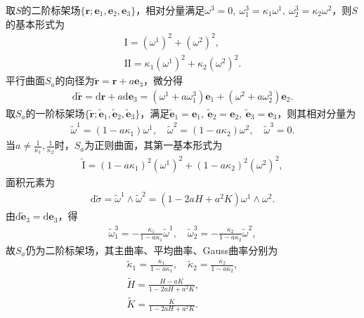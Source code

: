 \documentclass[../../main.tex]{subfiles}%
\begin{document}
\begin{solution}
取$S$的二阶标架场$\{\boldsymbol{r};\boldsymbol{e}_1,\boldsymbol{e}_2,\boldsymbol{e}_3\}$，相对分量满足$\omega^3=0,\ \omega_1^3=\kappa_1\omega^1,\ \omega_2^3=\kappa_2\omega^2$，则$S$的基本形式为
\begin{align}
\mathrm{I}=(\omega^1)^2+(\omega^2)^2,\label{eq:paral-I}\\
\mathrm{II}=\kappa_1(\omega^1)^2+\kappa_2(\omega^2)^2.\label{eq:paral-II}
\end{align}
平行曲面$S_a$的向径为$\tilde{\boldsymbol{r}}=\boldsymbol{r}+a\boldsymbol{e}_3$，微分得
\begin{align*}
\mathrm{d}\tilde{\boldsymbol{r}}=\mathrm{d}\boldsymbol{r}+a\mathrm{d}\boldsymbol{e}_3=(\omega^1+a\omega_1^3)\boldsymbol{e}_1+(\omega^2+a\omega_2^3)\boldsymbol{e}_2.
\end{align*}
取$S_a$的一阶标架场$\{\tilde{\boldsymbol{r}};\tilde{\boldsymbol{e}}_1,\tilde{\boldsymbol{e}}_2,\tilde{\boldsymbol{e}}_3\}$，满足$\tilde{\boldsymbol{e}}_1=\boldsymbol{e}_1,\ \tilde{\boldsymbol{e}}_2=\boldsymbol{e}_2,\ \tilde{\boldsymbol{e}}_3=\boldsymbol{e}_3$，则其相对分量为
\begin{align}
\tilde{\omega}^1=(1-a\kappa_1)\omega^1,\quad \tilde{\omega}^2=(1-a\kappa_2)\omega^2,\quad \tilde{\omega}^3=0.\label{eq:paral-omega}
\end{align}
当$a\neq\frac{1}{\kappa_1},\frac{1}{\kappa_2}$时，$S_a$为正则曲面，其第一基本形式为
\begin{align*}
\tilde{\mathrm{I}}=(1-a\kappa_1)^2(\omega^1)^2+(1-a\kappa_2)^2(\omega^2)^2,
\end{align*}
面积元素为
\begin{align}
\mathrm{d}\tilde{\sigma}=\tilde{\omega}^1\wedge\tilde{\omega}^2=(1-2aH+a^2K)\omega^1\wedge\omega^2.\label{eq:paral-area}
\end{align}
由$\mathrm{d}\tilde{\boldsymbol{e}}_3=\mathrm{d}\boldsymbol{e}_3$，得
\begin{align*}
\tilde{\omega}_1^3=-\frac{\kappa_1}{1-a\kappa_1}\tilde{\omega}^1,\quad \tilde{\omega}_2^3=-\frac{\kappa_2}{1-a\kappa_2}\tilde{\omega}^2,
\end{align*}
故$S_a$仍为二阶标架场，其主曲率、平均曲率、Gauss曲率分别为
\begin{align}
\tilde{\kappa}_1=\frac{\kappa_1}{1-a\kappa_1},\quad \tilde{\kappa}_2=\frac{\kappa_2}{1-a\kappa_2},\label{eq:paral-kappa}\\
\tilde{H}=\frac{H-aK}{1-2aH+a^2K},\label{eq:paral-H}\\
\tilde{K}=\frac{K}{1-2aH+a^2K}.\label{eq:paral-K}
\end{align}

\end{solution}
\end{document}
